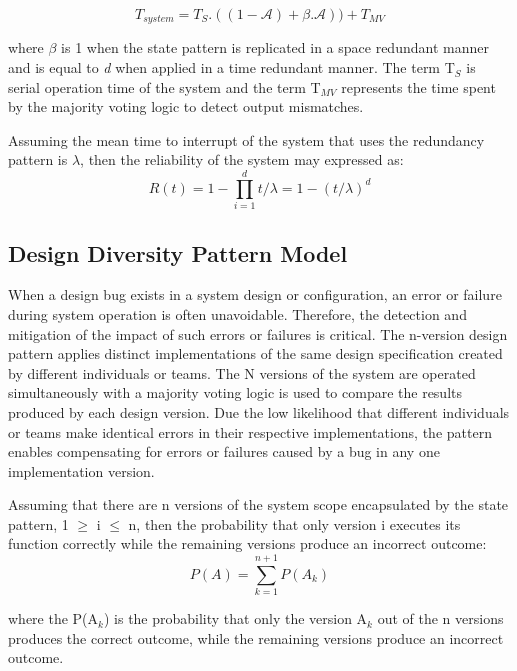 \begin{equation}
T_{system} = T_{S}.((1 - \mathcal{A}) + \beta.\mathcal{A}))  + T_{MV}
\label{eq:redundancy1}
\end{equation}

where $\beta$ is 1 when the state pattern is replicated in a space redundant manner and is equal to \textit{d} when applied in a time redundant manner. The term T$_{S}$ is serial operation time of the system and the term T$_{MV}$ represents the time spent by the majority voting logic to detect output mismatches.  

Assuming the mean time to interrupt of the system that uses the redundancy pattern is $\lambda$, then the reliability of the system may expressed as:
\begin{equation}
R(t) = 1 - \prod_{i=1}^{d} t/\lambda = 1 - (t/\lambda)^{d}  
\label{eq:redundancy2}
\end{equation}

\subsection{Design Diversity Pattern Model}
When a design bug exists in a system design or configuration, an error or failure during system operation is often unavoidable. Therefore, the detection and mitigation of the impact of such errors or failures is critical. The n-version design pattern applies distinct implementations of the same design specification created by different individuals or teams. The N versions of the system are operated simultaneously with a majority voting logic is used to compare the results produced by each design version. Due the low likelihood that different individuals or teams make identical errors in their respective implementations, the pattern enables compensating for errors or failures caused by a bug in any one implementation version.

Assuming that there are n versions of the system scope encapsulated by the state pattern, 1 $\geq$ i $\leq$ n, then the probability that only version i executes its function correctly while the remaining versions produce an incorrect outcome:
\begin{equation}
P(A) = \sum_{k=1}^{n+1} P(A_{k}) 
\label{eq:nversion1}
\end{equation}

where the P(A$_{k}$) is the probability that only the version A$_{k}$ out of the n versions produces the correct outcome, while the remaining versions produce an incorrect outcome.

